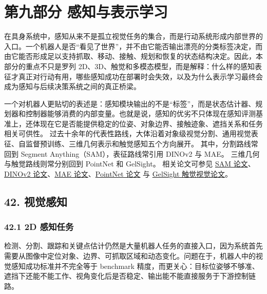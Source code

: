 
\part*{第九部分 感知与表示学习}

在具身系统中，感知从来不是孤立视觉任务的集合，而是行动系统形成内部世界的入口。一个机器人是否“看见了世界”，并不由它能否输出漂亮的分类标签决定，而由它能否形成足以支持抓取、移动、接触、规划和恢复的状态结构决定。因此，本部分的重点不只是罗列 2D、3D、触觉和多模态模型，而是解释：什么样的感知表征才真正对行动有用，哪些感知成功在部署时会失效，以及为什么表示学习最终会成为感知与后续决策系统之间的真正桥梁。

一个对机器人更贴切的表述是：感知模块输出的不是“标签”，而是状态估计器、规划器和控制器能够消费的内部变量。也就是说，感知的优劣不只体现在感知评测基准上，还体现在它是否能提供稳定的位姿、对象边界、接触迹象、遮挡关系和任务相关可供性。 过去十余年的代表性路线，大体沿着对象级视觉分割、通用视觉表征、自监督预训练、三维几何表示和触觉感知五个方向展开。 其中，分割路线常回到 Segment Anything（SAM），表征路线常引用 DINOv2 与 MAE。 三维几何与触觉路线则常分别回到 PointNet 和 GelSight。 相关论文可参见 \href{https://arxiv.org/abs/2304.02643}{SAM 论文}、\href{https://arxiv.org/abs/2304.07193}{DINOv2 论文}、\href{https://arxiv.org/abs/2111.06377}{MAE 论文}、\href{https://arxiv.org/abs/1612.00593}{PointNet 论文} 与 \href{https://arxiv.org/abs/1706.09942}{GelSight 触觉视觉论文}。

\chapter*{42. 视觉感知}

\section*{42.1 2D 感知任务}


检测、分割、跟踪和关键点估计仍然是大量机器人任务的直接入口，因为系统首先需要从图像中定位对象、边界、可抓取区域和动态变化。问题在于，机器人中的视觉感知成功标准并不完全等于 benchmark 精度，而更关心：目标位姿够不够准、遮挡下还能不能工作、视角变化后是否稳定、输出能不能直接服务于下游控制链路。

